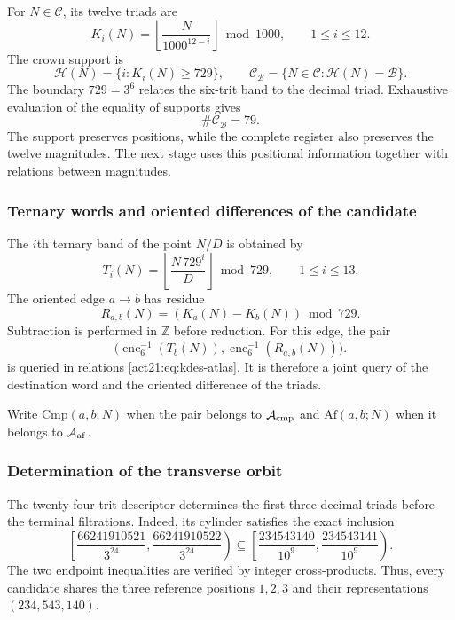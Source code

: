For $N\in\mathcal C$, its twelve triads are
\begin{equation}
 K_i(N)=\left\lfloor\frac{N}{1000^{12-i}}\right\rfloor\bmod1000,
 \qquad1\leq i\leq12.
 \label{act21:eq:kdes-triadas}
\end{equation}
The crown support is
\[
 \mathcal H(N)=\{i:K_i(N)\geq729\},
 \qquad
 \mathcal C_{\mathcal B}=\{N\in\mathcal C:\mathcal H(N)=\mathcal B\}.
\]
The boundary $729=3^6$ relates the six-trit band to the decimal
triad. Exhaustive evaluation of the equality of supports gives
\begin{equation}
 \#\mathcal C_{\mathcal B}=79.
 \label{act21:eq:kdes-79}
\end{equation}
The support preserves positions, while the complete register
also preserves the twelve magnitudes. The next stage uses this
positional information together with relations between magnitudes.

\subsubsection{Ternary words and oriented differences of the candidate}

The $i$th ternary band of the point $N/D$ is obtained by
\begin{equation}
 T_i(N)=\left\lfloor\frac{N\,729^i}{D}\right\rfloor\bmod729,
 \qquad1\leq i\leq13.
 \label{act21:eq:kdes-tercandidato}
\end{equation}
The oriented edge $a\to b$ has residue
\begin{equation}
 R_{a,b}(N)=(K_a(N)-K_b(N))\bmod729.
 \label{act21:eq:kdes-resarista}
\end{equation}
Subtraction is performed in $\mathbb Z$ before reduction. For this
edge, the pair
\[
 \bigl(\operatorname{enc}_6^{-1}(T_b(N)),
  \operatorname{enc}_6^{-1}(R_{a,b}(N))\bigr).
\]
is queried in relations \eqref{act21:eq:kdes-atlas}. It is therefore a
joint query of the destination word and the oriented difference of the
triads.

Write $\mathrm{Cmp}(a,b;N)$ when the pair belongs to
$\mathcal A_{\rm cmp}$ and $\mathrm{Af}(a,b;N)$ when it belongs to
$\mathcal A_{\rm af}$.

\subsubsection{Determination of the transverse orbit}

The twenty-four-trit descriptor determines the first three
decimal triads before the terminal filtrations. Indeed, its
cylinder satisfies the exact inclusion
\[
 \left[\frac{66241910521}{3^{24}},
       \frac{66241910522}{3^{24}}\right)
 \subseteq
 \left[\frac{234543140}{10^9},
       \frac{234543141}{10^9}\right).
\]
The two endpoint inequalities are verified by integer
cross-products. Thus, every candidate shares the three reference
positions $1,2,3$ and their representations $(234,543,140)$.

